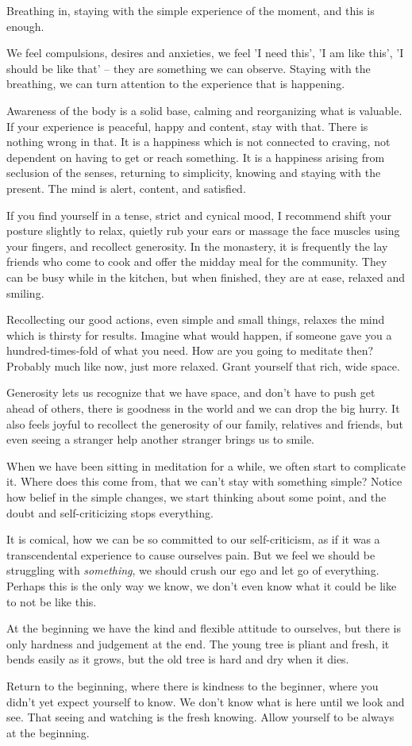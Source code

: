 Breathing in, staying with the simple experience of the moment, and this
is enough.

We feel compulsions, desires and anxieties, we feel 'I need this', 'I am
like this', 'I should be like that' -- they are something we can
observe. Staying with the breathing, we can turn attention to the
experience that is happening.

Awareness of the body is a solid base, calming and reorganizing what is
valuable. If your experience is peaceful, happy and content, stay with
that. There is nothing wrong in that. It is a happiness which is not
connected to craving, not dependent on having to get or reach something.
It is a happiness arising from seclusion of the senses, returning to
simplicity, knowing and staying with the present. The mind is alert,
content, and satisfied.

If you find yourself in a tense, strict and cynical mood, I recommend
shift your posture slightly to relax, quietly rub your ears or massage
the face muscles using your fingers, and recollect generosity. In the
monastery, it is frequently the lay friends who come to cook and offer
the midday meal for the community. They can be busy while in the
kitchen, but when finished, they are at ease, relaxed and smiling.

Recollecting our good actions, even simple and small things, relaxes the
mind which is thirsty for results. Imagine what would happen, if someone
gave you a hundred-times-fold of what you need. How are you going to
meditate then? Probably much like now, just more relaxed. Grant yourself
that rich, wide space.

Generosity lets us recognize that we have space, and don't have to push
get ahead of others, there is goodness in the world and we can drop the
big hurry. It also feels joyful to recollect the generosity of our
family, relatives and friends, but even seeing a stranger help another
stranger brings us to smile.

When we have been sitting in meditation for a while, we often start to
complicate it. Where does this come from, that we can't stay with
something simple? Notice how belief in the simple changes, we start
thinking about some point, and the doubt and self-criticizing stops
everything.

It is comical, how we can be so committed to our self-criticism, as if
it was a transcendental experience to cause ourselves pain. But we feel
we should be struggling with \emph{something}, we should crush our ego
and let go of everything. Perhaps this is the only way we know, we don't
even know what it could be like to not be like this.

At the beginning we have the kind and flexible attitude to ourselves,
but there is only hardness and judgement at the end. The young tree is
pliant and fresh, it bends easily as it grows, but the old tree is hard
and dry when it dies.

Return to the beginning, where there is kindness to the beginner, where
you didn't yet expect yourself to know. We don't know what is here until
we look and see. That seeing and watching is the fresh knowing. Allow
yourself to be always at the beginning.
